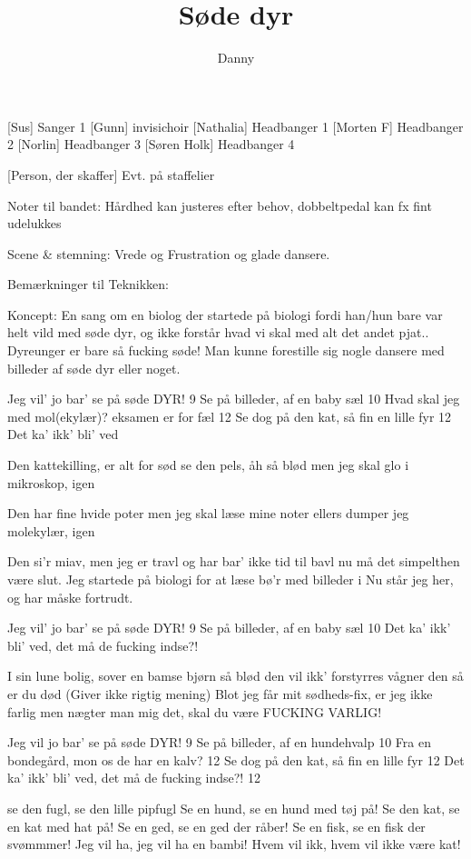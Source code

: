 \documentclass[a4paper,11pt]{article}
\title{Søde dyr}
\author{Danny}
\begin{document}
\maketitle

\begin{roles}
    [Sus] Sanger 1
    [Gunn] invisichoir
    [Nathalia] Headbanger 1
[Morten F] Headbanger 2
[Norlin] Headbanger 3
[Søren Holk] Headbanger 4
\end{roles}

\begin{props}
    [Person, der skaffer] Evt. på staffelier
\end{props}


\scene

Noter til bandet:
Hårdhed kan justeres efter behov, dobbeltpedal kan fx fint udelukkes

Scene \& stemning:
Vrede og Frustration og glade dansere.

Bemærkninger til Teknikken:


Koncept:
En sang om en biolog der startede på biologi fordi han/hun bare var helt vild med søde dyr, og ikke forstår hvad vi skal med alt det andet pjat.. Dyreunger er bare så fucking søde!
Man kunne forestille sig nogle dansere med billeder af søde dyr eller noget.

\begin{song}
Jeg vil’ jo bar’ se på søde DYR! 9
Se på billeder, af en baby sæl 10
Hvad skal jeg med mol(ekylær)? eksamen er for fæl 12
Se dog på den kat, så fin en lille fyr   12
Det ka’ ikk’ bli’ ved

Den kattekilling, er alt for sød
se den pels, åh så blød
men jeg skal glo i mikroskop, igen

Den har fine hvide poter
men jeg skal læse mine noter
ellers dumper jeg molekylær, igen

Den si’r miav, men jeg er travl
og har bar’ ikke tid til bavl
nu må det simpelthen være slut.
Jeg startede på biologi
for at læse bø’r med billeder i
Nu står jeg her, og har måske fortrudt.

Jeg vil’ jo bar’ se på søde DYR! 9
Se på billeder, af en baby sæl 10
Det ka’ ikk’ bli’ ved, det må de fucking indse?!

I sin lune bolig,
sover en bamse bjørn så blød
den vil ikk’ forstyrres
vågner den så er du død (Giver ikke rigtig mening)
Blot jeg får mit sødheds-fix, er jeg ikke farlig 
men nægter man mig det, skal
du være FUCKING VARLIG!

Jeg vil jo bar’ se på søde DYR! 9
Se på billeder, af en hundehvalp 10
Fra en bondegård, mon os de har en kalv? 12
Se dog på den kat, så fin en lille fyr   12
Det ka’ ikk’ bli’ ved, det må de fucking indse?! 12

se den fugl, se den lille pipfugl
Se en hund, se en hund med tøj på!
Se den kat, se en kat med hat på!
Se en ged, se en ged der råber!
Se en fisk, se en fisk der svømmmer!
Jeg vil ha, jeg vil ha en bambi!
Hvem vil ikk, hvem vil ikke være kat!


\end{song}
\end{document}
